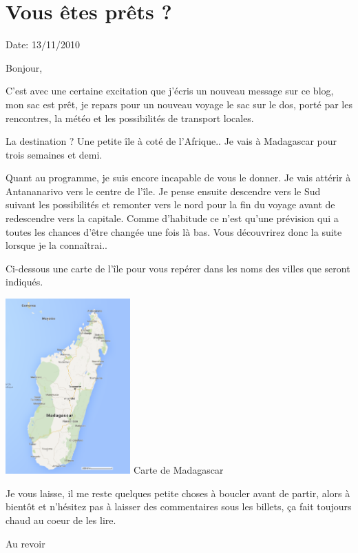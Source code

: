 \section{Vous êtes prêts ?}

Date: 13/11/2010

\begin{multicols}{2}

Bonjour,

C'est avec une certaine excitation que j'écris un nouveau message sur ce blog, mon sac est prêt, je repars pour un nouveau voyage le sac sur le dos, porté par les rencontres, la météo et les possibilités de transport locales.

La destination ? Une petite île à coté de l'Afrique.. Je vais à Madagascar pour trois semaines et demi.

Quant au programme, je suis encore incapable de vous le donner. Je vais attérir à Antananarivo vers le centre de l'île. Je pense ensuite descendre vers le Sud suivant les possibilités et remonter vers le nord pour la fin du voyage avant de redescendre vers la capitale. Comme d'habitude ce n'est qu'une prévision qui a toutes les chances d'être changée une fois là bas. Vous découvrirez donc la suite lorsque je la connaîtrai..

Ci-dessous une carte de l'île pour vous repérer dans les noms des villes que seront indiqués.

\hspace*{-0.65cm}
\includegraphics[width=4.8cm]{articles/Vous-etes-prets/madagascar.png}
Carte de Madagascar

Je vous laisse, il me reste quelques petite choses à boucler avant de partir, alors à bientôt et n'hésitez pas à laisser des commentaires sous les billets, ça fait toujours chaud au coeur de les lire.

Au revoir

\end{multicols}
